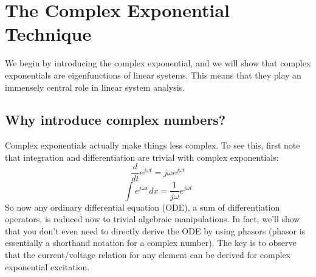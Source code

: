 \section{The Complex Exponential Technique}
We begin by introducing the complex exponential, and we will show that complex exponentials are eigenfunctions of linear systems.  This means that they play an immensely central role in linear system analysis.
\subsection{Why introduce complex numbers?}
Complex exponentials actually make things less complex.  To see this, first note that integration and differentiation are trivial with complex exponentials:
    \begin{equation}
        \frac{d}{dt} e^{j\omega t} = j \omega e^{j\omega t}
    \end{equation}
    \begin{equation}
        \int e^{j\omega x} dx = \frac{1}{j \omega} e^{j\omega t}
    \end{equation}
So now any ordinary differential equation (ODE), a sum of differentiation operators, is reduced now to trivial algebraic manipulations.  In fact, we'll show that you don't even need to directly derive the ODE by using phasors (phasor is essentially a shorthand notation for a complex number).   The key is to observe that the current/voltage relation for any element can be derived for complex exponential excitation.
